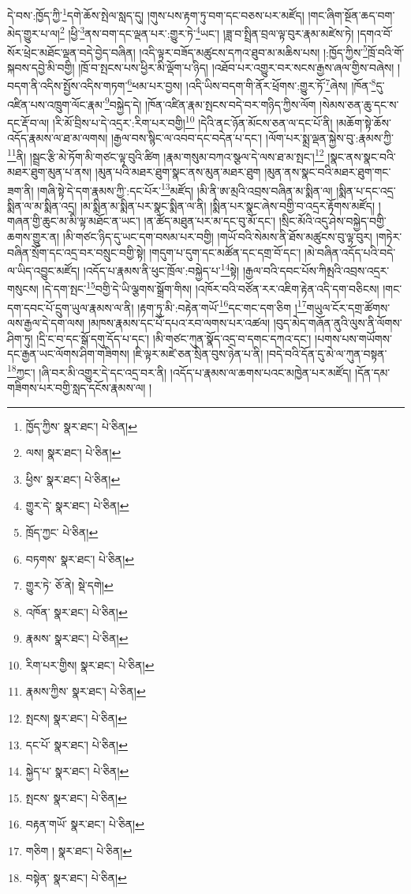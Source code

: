 དེ་བས་:ཁྱོད་ཀྱི་\footnote{ཁྱོད་ཀྱིས་  སྣར་ཐང་།  པེ་ཅིན། }དགེ་ཆོས་སྤེལ་སླད་དུ། །གུས་པས་རྟག་ཏུ་བག་དང་བཅས་པར་མཛོད། །གང་ཞིག་སྔོན་ཆད་བག་མེད་གྱུར་པ་ལ།\footnote{ལས།  སྣར་ཐང་།  པེ་ཅིན། } །ཕྱི་\footnote{ཕྱིས་  སྣར་ཐང་།  པེ་ཅིན། }ནས་བག་དང་ལྡན་པར་:གྱུར་ཏེ་\footnote{གྱུར་དེ་  སྣར་ཐང་།  པེ་ཅིན། }ཡང་། །ཟླ་བ་སྤྲིན་བྲལ་ལྟ་བུར་རྣམ་མཛེས་ཏེ། །དགའ་བོ་སོར་ཕྲེང་མཐོང་ལྡན་བདེ་བྱེད་བཞིན། །འདི་ལྟར་བཟོད་མཚུངས་དཀའ་ཐུབ་མ་མཆིས་པས། །:ཁྱོད་ཀྱིས་\footnote{ཁྲོད་ཀྱང་  པེ་ཅིན། }ཁྲོ་བའི་གོ་སྐབས་དབྱེ་མི་བགྱི། །ཁྲོ་བ་སྤངས་པས་ཕྱིར་མི་ལྡོག་པ་ཉིད། །འཐོབ་པར་འགྱུར་བར་སངས་རྒྱས་ཞལ་གྱིས་བཞེས། །བདག་ནི་འདིས་སྤྱོས་འདིས་གཏག་\footnote{བཏགས་  སྣར་ཐང་།  པེ་ཅིན། }ཕམ་པར་བྱས། །འདི་ཡིས་བདག་གི་ནོར་ཕྲོགས་:གྱུར་ཏོ་\footnote{གྱུར་ཏེ་  ཅོ་ནེ།  སྡེ་དགེ། }ཞེས། །ཁོན་\footnote{འཁོན་  སྣར་ཐང་།  པེ་ཅིན། }དུ་འཛིན་པས་འཁྲུག་ལོང་རྣམ་\footnote{རྣམས་  སྣར་ཐང་།  པེ་ཅིན། }བསྐྱེད་དེ། །ཁོན་འཛིན་རྣམ་སྤངས་བདེ་བར་གཉིད་ཀྱིས་ལོག །སེམས་ཅན་ཆུ་དང་ས་དང་རྡོ་བ་ལ། །རི་མོ་བྲིས་པ་དེ་འདྲར་:རིག་པར་བགྱི།\footnote{རིག་པར་གྱིས།  སྣར་ཐང་།  པེ་ཅིན། } །དེའི་ནང་ཉོན་མོངས་ཅན་ལ་དང་པོ་ནི། །མཆོག་སྟེ་ཆོས་འདོད་རྣམས་ལ་ཐ་མ་ལགས། །རྒྱལ་བས་སྙིང་ལ་འབབ་དང་བདེན་པ་དང་། །ལོག་པར་སྨྲ་ལྡན་སྐྱེས་བུ་:རྣམས་ཀྱི་\footnote{རྣམས་ཀྱིས་  སྣར་ཐང་།  པེ་ཅིན། }ནི། །སྦྲང་རྩི་མེ་ཏོག་མི་གཙང་ལྟ་བུའི་ཚིག །རྣམ་གསུམ་བཀའ་སྩལ་དེ་ལས་ཐ་མ་སྤང་།\footnote{སྤངས།  སྣར་ཐང་།  པེ་ཅིན། } །སྣང་ནས་སྣང་བའི་མཐར་ཐུག་མུན་པ་ནས། །མུན་པའི་མཐར་ཐུག་སྣང་ནས་མུན་མཐར་ཐུག །མུན་ནས་སྣང་བའི་མཐར་ཐུག་གང་ཟག་ནི། །གཞི་སྟེ་དེ་དག་རྣམས་ཀྱི་:དང་པོར་\footnote{དང་པོ་  སྣར་ཐང་།  པེ་ཅིན། }མཛོད། །མི་ནི་ཨ་མྲའི་འབྲས་བཞིན་མ་སྨིན་ལ། །སྨིན་པ་དང་འདྲ་སྨིན་ལ་མ་སྨིན་འདྲ། །མ་སྨིན་མ་སྨིན་པར་སྣང་སྨིན་ལ་ནི། །སྨིན་པར་སྣང་ཞེས་བགྱི་བ་འདྲར་རྟོགས་མཛོད། །གཞན་གྱི་ཆུང་མ་མི་ལྟ་མཐོང་ན་ཡང་། །ན་ཚོད་མཐུན་པར་མ་དང་བུ་མོ་དང་། །སྲིང་མོའི་འདུ་ཤེས་བསྐྱེད་བགྱི་ཆགས་གྱུར་ན། །མི་གཙང་ཉིད་དུ་ཡང་དག་བསམ་པར་བགྱི། །གཡོ་བའི་སེམས་ནི་ཐོས་མཚུངས་བུ་ལྟ་བུར། །གཏེར་བཞིན་སྲོག་དང་འདྲ་བར་བསྲུང་བགྱི་སྟེ། །གདུག་པ་དུག་དང་མཚོན་དང་དགྲ་བོ་དང་། །མེ་བཞིན་འདོད་པའི་བདེ་ལ་ཡིད་འབྱུང་མཛོད། །འདོད་པ་རྣམས་ནི་ཕུང་ཁྲོལ་:བསྐྱེད་པ་\footnote{སྐྱེད་པ་  སྣར་ཐང་།  པེ་ཅིན། }སྟེ། །རྒྱལ་བའི་དབང་པོས་ཀིམྤའི་འབྲས་འདྲར་གསུངས། །དེ་དག་སྤང་\footnote{སྤངས་  སྣར་ཐང་།  པེ་ཅིན། }བགྱི་དེ་ཡི་ལྕགས་སྒྲོག་གིས། །འཁོར་བའི་བཙོན་རར་འཇིག་རྟེན་འདི་དག་བཅིངས། །གང་དག་དབང་པོ་དྲུག་ཡུལ་རྣམས་ལ་ནི། །རྟག་ཏུ་མི་:བརྟེན་གཡོ་\footnote{བརྟན་གཡོ་  སྣར་ཐང་།  པེ་ཅིན། }དང་གང་དག་ཅིག །\footnote{གཅིག །  སྣར་ཐང་།  པེ་ཅིན། }གཡུལ་ངོར་དགྲ་ཚོགས་ལས་རྒྱལ་དེ་དག་ལས། །མཁས་རྣམས་དང་པོ་དཔའ་རབ་ལགས་པར་འཚལ། །བུད་མེད་གཞོན་ནུའི་ལུས་ནི་ལོགས་ཤིག་ཏུ། །དྲི་ང་བ་དང་སྒོ་དགུ་དོད་པ་དང་། །མི་གཙང་ཀུན་སྣོད་འདྲ་བ་དགང་དཀའ་དང་། །པགས་པས་གཡོགས་དང་རྒྱན་ཡང་ལོགས་ཤིག་གཟིགས། །ཇི་ལྟར་མཛེ་ཅན་སྲིན་བུས་ཉེན་པ་ནི། །བདེ་བའི་དོན་དུ་མེ་ལ་ཀུན་བསྟན་\footnote{བསྟེན་  སྣར་ཐང་།  པེ་ཅིན། }ཀྱང་། །ཞི་བར་མི་འགྱུར་དེ་དང་འདྲ་བར་ནི། །འདོད་པ་རྣམས་ལ་ཆགས་པའང་མཁྱེན་པར་མཛོད། །དོན་དམ་གཟིགས་པར་བགྱི་སླད་དངོས་རྣམས་ལ། །
